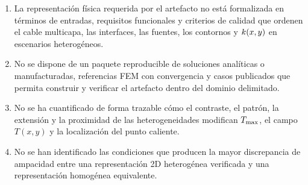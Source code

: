 \begin{enumerate}[label=PE\arabic*.]
  \item La representación física requerida por el artefacto no está formalizada en términos de entradas, requisitos funcionales y criterios de calidad que ordenen el cable multicapa, las interfaces, las fuentes, los contornos y $k(x,y)$ en escenarios heterogéneos.
  \item No se dispone de un paquete reproducible de soluciones analíticas o manufacturadas, referencias FEM con convergencia y casos publicados que permita construir y verificar el artefacto dentro del dominio delimitado.
  \item No se ha cuantificado de forma trazable cómo el contraste, el patrón, la extensión y la proximidad de las heterogeneidades modifican $T_{\max}$, el campo $T(x,y)$ y la localización del punto caliente.
  \item No se han identificado las condiciones que producen la mayor discrepancia de ampacidad entre una representación 2D heterogénea verificada y una representación homogénea equivalente.
\end{enumerate}

